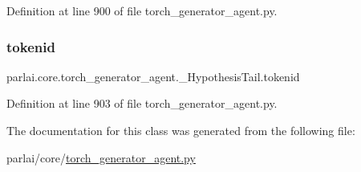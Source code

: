 Definition at line 900 of file torch\+\_\+generator\+\_\+agent.\+py.

\mbox{\label{classparlai_1_1core_1_1torch__generator__agent_1_1__HypothesisTail_a354a80abd13b7da3fd1d116c639a4f1a}} 
\subsubsection{\texorpdfstring{tokenid}{tokenid}}
{\footnotesize\ttfamily parlai.\+core.\+torch\+\_\+generator\+\_\+agent.\+\_\+\+Hypothesis\+Tail.\+tokenid}



Definition at line 903 of file torch\+\_\+generator\+\_\+agent.\+py.



The documentation for this class was generated from the following file\+:\begin{DoxyCompactItemize}
\item 
parlai/core/\hyperlink{torch__generator__agent_8py}{torch\+\_\+generator\+\_\+agent.\+py}\end{DoxyCompactItemize}

